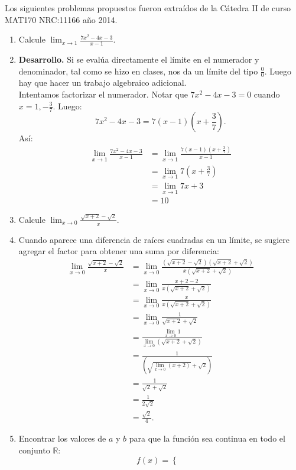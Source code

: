 \documentclass[10pt]{article}
\newcommand{\2}[1]{\hspace{-0.93cm}\colorbox{color1}{\hspace{0.07cm} \parbox{17cm}{\vspace{0.2cm} #1}\hspace*{0.07cm} }}
\newcommand{\3}[1]{\hspace{-0.93cm}\colorbox{color7}{\hspace{0.07cm} \parbox{17cm}{\vspace{0.2cm} #1}\hspace*{0.07cm} }}
\theoremstyle{theorem}
\newcommand{\R}{\mathbb{R}}
\numberwithin{equation}{section}
\newcommand{\dis}{\displaystyle}
\begin{document}
Los siguientes problemas propuestos fueron extra\'idos de la C\'atedra II de curso MAT170 NRC:11166 a\~no 2014.
\begin{enumerate}[1.]
  \item Calcule $\dis \lim_{x\to 1}\frac{7x^2-4x-3}{x-1}$.
  \item[] \textbf{Desarrollo.}
  Si se eval\'ua directamente el l\'imite en el numerador y denominador, tal como se hizo en clases, nos da un l\'imite del tipo $\dis \frac{0}{0}$. Luego hay que hacer un trabajo algebraico adicional.\\
  Intentamos factorizar el numerador. Notar que $7x^2-4x-3=0$ cuando $\dis x=1,-\frac{3}{7}$. Luego: $$7x^2-4x-3=7(x-1)\left(x+\frac{3}{7}\right).$$
As\'i:  
  \begin{align*}
  \lim_{x\to 1}\frac{7x^2-4x-3}{x-1}&=\lim_{x\to 1}\frac{7(x-1)\left(x+\frac{3}{7}\right)}{x-1}\\
                                    &=\lim_{x\to 1}7\left(x+\frac{3}{7}\right)\\
                                    &=\lim_{x\to 1}7x+3\\
                                    &=10
  \end{align*}
  \item Calcule $\dis \lim_{x\to 0}\frac{\sqrt{x+2}-\sqrt{2}}{x}$.
  \item[] Cuando aparece una diferencia de ra\'ices cuadradas en un l\'imite, se sugiere agregar el factor para obtener una suma por diferencia: 
  \begin{align*}
   \lim_{x\to 0}\frac{\sqrt{x+2}-\sqrt{2}}{x}&=\lim_{x\to 0}\frac{(\sqrt{x+2}-\sqrt{2})(\sqrt{x+2}+\sqrt{2})}{x(\sqrt{x+2}+\sqrt{2})}\\
   &=\lim_{x\to 0}\frac{x+2-2}{x(\sqrt{x+2}+\sqrt{2})}\\
   &=\lim_{x\to 0}\frac{x}{x(\sqrt{x+2}+\sqrt{2})}\\
   &=\lim_{x\to 0}\frac{1}{\sqrt{x+2}+\sqrt{2}}\\
   &=\frac{\lim_{x\to 0} 1}{\lim_{x\to 0}(\sqrt{x+2}+\sqrt{2})}\\
   &=\frac{ 1}{(\sqrt{\lim_{x\to 0}(x+2)}+\sqrt{2})}\\
   &=\frac{1}{\sqrt{2}+\sqrt{2}}\\
   &=\frac{1}{2\sqrt{2}}\\
   &=\frac{\sqrt{2}}{4}.
  \end{align*}
  \item Encontrar los valores de $a$ y $b$ para que la funci\'on sea continua en todo el conjunto $\R$: $$f(x)=\left\lbrace  \begin{array}{ccc}

\end{array}$$
\end{enumerate}
\end{document}
